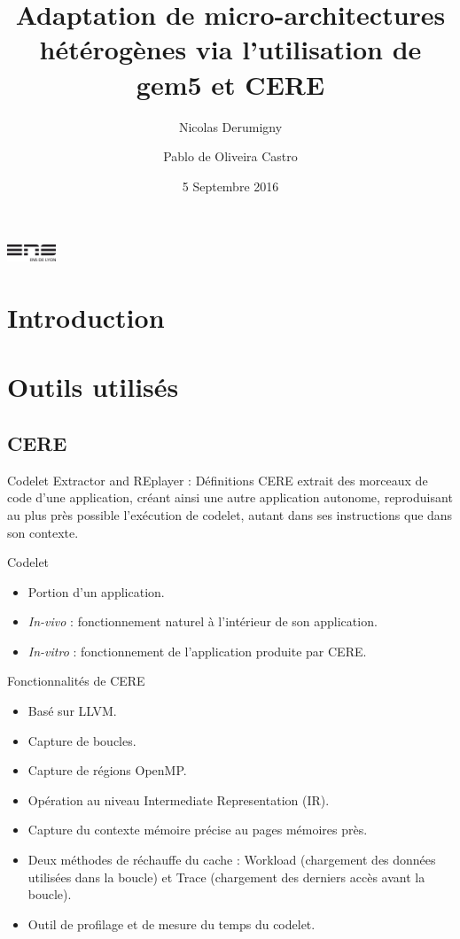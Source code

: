 \documentclass{beamer}
\title[Adaptation de micro-architectures hétérogènes]{Adaptation de micro-architectures hétérogènes via l'utilisation de gem5 et CERE}
\author[N. Derumigny et P.De Oliveira]{Nicolas Derumigny \and Pablo de Oliveira Castro}
\institute[]{ENS Lyon \hspace*{8em} UVSQ \hspace*{3em}}
\date{5 Septembre 2016}
\begin{document}
\begin{frame}
	\titlepage
	\begin{center}
	\includegraphics[height=0.5cm]{logoens.pdf}

	\end{center}
\end{frame}




\section{Introduction}
\begin{frame}
\end{frame}

\section{Outils utilisés}
\subsection{CERE}
\begin{frame}{Codelet Extractor and REplayer : Définitions}
CERE extrait des morceaux de code d'une application, créant ainsi une autre application autonome, reproduisant au plus près possible l'exécution de codelet, autant dans ses instructions que dans son contexte.

\begin{block}{Codelet}
\begin{itemize}
\item Portion d'un application. 
\item \textit{In-vivo} : fonctionnement naturel à l'intérieur de son application.
\item \textit{In-vitro} : fonctionnement de l'application produite par CERE.
\end{itemize}
\end{block}
\end{frame}

\begin{frame}{Fonctionnalités de CERE}
\begin{itemize}
\item Basé sur LLVM.
\item Capture de boucles.
\item Capture de régions OpenMP.
\item Opération au niveau Intermediate Representation (IR).
\item Capture du contexte mémoire précise au pages mémoires près.
\item Deux méthodes de réchauffe du cache : Workload (chargement des données utilisées dans la boucle) et Trace (chargement des derniers accès avant la boucle).
\item Outil de profilage et de mesure du temps du codelet.
\end{itemize}
\end{frame}
\end{document}
